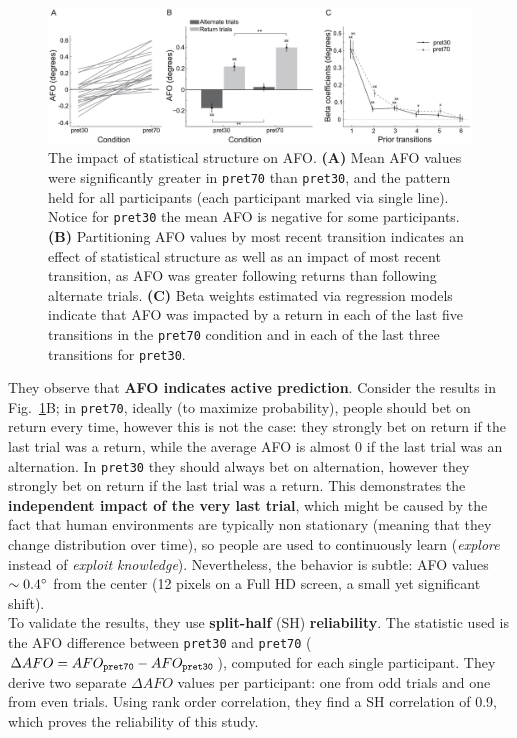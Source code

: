\begin{figure}[!ht]
    \centering
    \captionsetup{width=.8\linewidth}
    \includegraphics[width=0.9\linewidth]{images/afo_2.png}
    \caption{The impact of statistical structure on AFO. \textbf{(A)} Mean AFO values were significantly greater in \texttt{pret70} than \texttt{pret30}, and the pattern held for all participants (each participant marked via single line). Notice for \texttt{pret30} the mean AFO is negative for some participants. \textbf{(B)} Partitioning AFO values by most recent transition indicates an effect of statistical structure as well as an impact of most recent transition, as AFO was greater following returns than following alternate trials. \textbf{(C)} Beta weights estimated via regression models indicate that AFO was impacted by a return in each of the last five transitions in the \texttt{pret70} condition and in each of the last three transitions for \texttt{pret30}.}
    \label{fig:afo_2}
\end{figure}

They observe that \textbf{AFO indicates active prediction}. Consider the results in Fig.~\ref{fig:afo_2}B; in \texttt{pret70}, ideally (to maximize probability), people should bet on return every time, however this is not the case: they strongly bet on return if the last trial was a return, while the average AFO is almost 0 if the last trial was an alternation. In \texttt{pret30} they should always bet on alternation, however they strongly bet on return if the last trial was a return. This demonstrates the \textbf{independent impact of the very last trial}, which might be caused by the fact that human environments are typically non stationary (meaning that they change distribution over time), so people are used to continuously learn (\textit{explore} instead of \textit{exploit knowledge}). Nevertheless, the behavior is subtle: AFO values $\sim 0.4\degree$ from the center (12 pixels on a Full HD screen, a small yet significant shift).\\

To validate the results, they use \textbf{split-half} (SH) \textbf{reliability}. The statistic used is the AFO difference between \texttt{pret30} and \texttt{pret70} ($\Delta AFO = AFO_{\text{\texttt{pret70}}} - AFO_{\text{\texttt{pret30}}}$), computed for each single participant. They derive two separate $\Delta AFO$ values per participant: one from odd trials and one from even trials. Using rank order correlation, they find a SH correlation of 0.9, which proves the reliability of this study.

